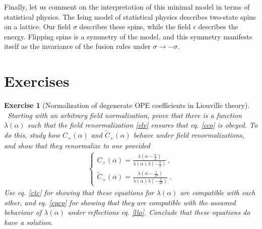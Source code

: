 \documentclass[12pt, a4paper, notitlepage, twoside]{report}
\numberwithin{equation}{section}
\theoremstyle{break}
\newtheorem{exo}{Exercise}[chapter]
\begin{document}
Finally, let us comment on the interpretation of this minimal model in terms of statistical physics.
The Ising model of statistical physics describes two-state spins on a lattice.
Our field $\sigma$ describes these spins, while the field $\epsilon$ describes the energy.
Flipping spins is a symmetry of the model, and this symmetry manifests itself as the invariance of the fusion rules under $\sigma\to -\sigma$. 

\section{Exercises}

\begin{exo}[Normalization of degenerate OPE coefficients in Liouville theory]
 ~\label{exonorm}
Starting with an arbitrary field normalization, prove that there is a function $\lambda(\alpha)$ such that the field renormalization \eqref{vlv} ensures that eq. \eqref{cco} is obeyed.
To do this, study how $C_+(\alpha)$ and $\tilde{C}_+(\alpha)$ behave under field renormalizations, and show that they renormalize to one provided
\begin{align}
\left\{\begin{array}{l} 
 C_+(\alpha) = \frac{\lambda(\alpha-\frac{b}{2})}{\lambda(\alpha)\lambda(-\frac{b}{2})} \ ,
\\
\tilde{C}_+(\alpha) = \frac{\lambda(\alpha-\frac{1}{2b})}{\lambda(\alpha)\lambda(-\frac{1}{2b})} \ .
\end{array}\right. 
\end{align}
Use eq. \eqref{ctc} for showing that these equations for $\lambda(\alpha)$ are compatible with each other, and eq. \eqref{cpcp} for showing that they are compatible with the  assumed behaviour of $\lambda(\alpha)$ under reflections eq. \eqref{llo}.
Conclude that these equations do have a solution.
\end{exo}
\end{document}
